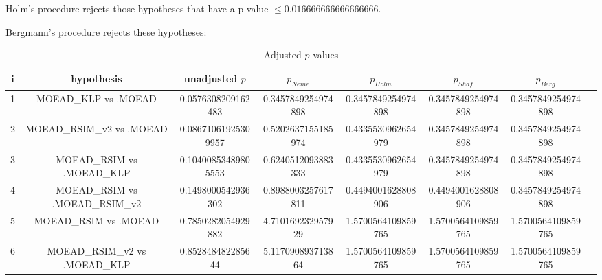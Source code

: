 \documentclass[a4paper,10pt]{article}
\begin{document}
\begin{landscape}
Holm's procedure rejects those hypotheses that have a p-value $\le0.016666666666666666$.


Bergmann's procedure rejects these hypotheses:


\begin{itemize}


\end{itemize}


\begin{table}[!htp]
\centering\tiny
\caption{Adjusted $p$-values}
\begin{tabular}{cccccccc}
i&hypothesis&unadjusted $p$&$p_{Neme}$&$p_{Holm}$&$p_{Shaf}$&$p_{Berg}$\\
\hline
1&MOEAD_KLP vs .MOEAD&0.0576308209162483&0.3457849254974898&0.3457849254974898&0.3457849254974898&0.3457849254974898\\
2&MOEAD_RSIM_v2 vs .MOEAD&0.08671061925309957&0.5202637155185974&0.4335530962654979&0.3457849254974898&0.3457849254974898\\
3&MOEAD_RSIM vs .MOEAD_KLP&0.10400853489805553&0.6240512093883333&0.4335530962654979&0.3457849254974898&0.3457849254974898\\
4&MOEAD_RSIM vs .MOEAD_RSIM_v2&0.1498000542936302&0.8988003257617811&0.4494001628808906&0.4494001628808906&0.3457849254974898\\
5&MOEAD_RSIM vs .MOEAD&0.7850282054929882&4.710169232957929&1.5700564109859765&1.5700564109859765&1.5700564109859765\\
6&MOEAD_RSIM_v2 vs .MOEAD_KLP&0.852848482285644&5.117090893713864&1.5700564109859765&1.5700564109859765&1.5700564109859765\\
\hline
\end{tabular}
\end{table}

\end{landscape}
\end{document}
